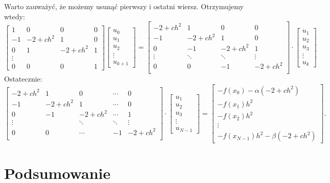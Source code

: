 \documentclass[12pt,a4paper]{report}
\begin{document}
Warto zauważyć, że możemy usunąć pierwszy i ostatni wiersz. Otrzymujemy wtedy:
$$ 
\left[ \begin{array}{cccc}
1 & 0 & 0 & 0 \\
-1 & -2+ch^2 & 1 & 0 \\
0 & 1 & -2+ch^2 & 1 \\
\vdots &  &  &  \\
0 & 0 & 0 & 1 
\end{array} \right]
\left[ \begin{array}{c}
u_0 \\
u_1 \\
u_2 \\
\vdots \\
u_{k+1}  
\end{array} \right] = 
\left[ \begin{array}{cccc}
-2+ch^2 & 1 & 0 & 0 \\
-1 & -2+ch^2 & 1 & 0 \\
0 & -1 & -2+ch^2 & 1 \\
\vdots & \ddots & \ddots & \vdots \\ 
0 & 0 & -1 & -2+ch^2 \\
\end{array} \right] \cdot
\left[ \begin{array}{c}
u_1 \\
u_2 \\
u_3 \\
\vdots \\
u_{k} 
\end{array} \right] 
$$
Ostatecznie:
$$
\left[ \begin{array}{ccccc}
-2+ch^2 & 1 & 0 & \cdots & 0 \\
-1 & -2+ch^2 & 1& \cdots & 0 \\
0 & -1 & -2+ch^2& \cdots & 1 \\
\vdots &  & \ddots & \ddots & \vdots \\ 
0 & 0 & \cdots & -1 & -2+ch^2 \\
\end{array} \right] \cdot
\left[ \begin{array}{c}
u_1 \\
u_2 \\
u_3 \\
\vdots \\
u_{N-1} 
\end{array} \right] =
\left[ \begin{array}{c}
-f(x_0)-\alpha(-2+ch^2) \\
-f(x_1)h^2 \\
-f(x_2)h^2\\
\vdots \\
-f(x_{N-1})h^2 -\beta (-2+ch^2)   
\end{array} \right] . 
$$


\chapter{Podsumowanie}
\begin{example}[Przykład] \label{example-otwarty-euler}
\end{example}



\end{document}
